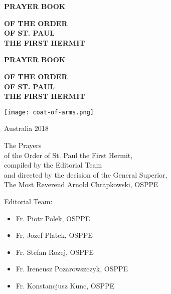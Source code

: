 \pagestyle{empty}

\hspace{0pt}
\vfill

\begin{center}
\uppercase{\textbf{\Large Prayer Book}} \par
\vspace{1em}
\uppercase{\textbf{\normalsize of the Order \\
of St. Paul \\
the First Hermit}} \par
\end{center}

\vfill
\hspace{0pt}

\newpage\null\thispagestyle{empty}\newpage

\hspace{0pt}
\vfill

\begin{center}
\uppercase{\textbf{\huge Prayer Book}} \par
\vspace{1em}
\uppercase{\textbf{\large of the Order\\
of St. Paul \\
the First Hermit}} \par
\end{center}

\begin{center}
\texttt{[image: coat-of-arms.png]}
\end{center}

\vfill

\begin{center}
Australia 2018
\end{center}

\hspace{0pt}
\pagebreak

\begin{center}
The Prayers \\ of the Order of St. Paul the First Hermit,\\
compiled by the Editorial Team \\ and directed by the decision
of the General Superior,\\ The Most Reverend Arnold Chrapkowski, OSPPE
\end{center}

\vspace{4em}

Editorial Team:
\begin{itemize}
\item Fr. Piotr Polek, OSPPE
\item Fr. Jozef Platek, OSPPE
\item Fr. Stefan Rozej, OSPPE
\item Fr. Ireneusz Pozarowszczyk, OSPPE
\item Fr. Konstancjusz Kunc, OSPPE
\end{itemize}
\medbreak


